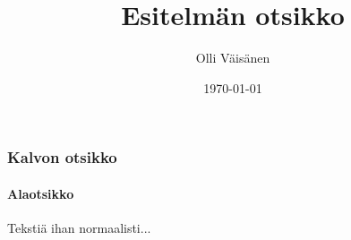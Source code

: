 \documentclass[12pt]{beamer}
\begin{document}
\dmyyyydate %

\author{Olli Väisänen}
\title{Esitelmän otsikko}
\date{\today} %
\begin{frame}[plain]
	\titlepage
\end{frame}

\begin{frame}
\frametitle{Kalvon otsikko}
\framesubtitle{Alaotsikko}
Tekstiä ihan normaalisti...

\end{frame}

\begin{comment}
Beamer-ympäristön ohjeita

Esimerkki beamer-luokan overlay-argumentista (käytettynä itemize-ympäristössä), jolla jutut näkyvät vain tietyillä sivuilla kalvoa:
\begin{itemize}
	\item<1> Tämä näkyy vain ekalla sivulla.
	\item<2-> Tämä näkyy tokasta sivusta eteenpäin.
	\item<1,3,5-> Myös tällainen onnistuu jos muka tarvitsee...
\end{itemize}
Komennolla \setbeamercovered voidaan määrittää miten piilotetut jutut näkyvät, esim. oletusargumentilla invisible poissa näkyvistä, transparent läpinäkyviä

beamer määrittelee uuden huomiokomennon \alert{huomio} (oletuksena punainen) toimii myös overlayn kanssa, esim:
Tekstin joukossa oleva \alert<4>{HUOM!} on punainen vain sivulla 4, eikä enää siitä eteenpäin.
Toimii myös näin:
	\item<alert@4> Jee jee!

Laatikkoon tulevaa tekstiä saa useilla erilaisilla ympäristöillä kuten block, exampleblock ja alertblock. Pakollisena argumenttina laatikon otsikko. Esim:
\begin{block}{Laatikon otsikko}
Laatikkoon tulevaa tavaraa
\end{block}
Laatikolle voi myös antaa overlay-määreen, jolloin laatikko näkyy vain tietyllä sivulla.


\end{comment}
\end{document}
